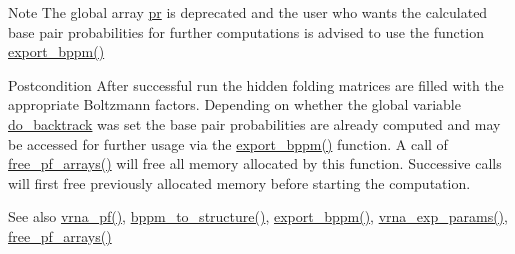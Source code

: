 \begin{DoxyNote}{Note}
The global array \mbox{\hyperlink{fold__vars_8h_ac98ec419070aee6831b44e5c700f090f}{pr}} is deprecated and the user who wants the calculated base pair probabilities for further computations is advised to use the function \mbox{\hyperlink{group__pf__fold_gac5ac7ee281aae1c5cc5898a841178073}{export\+\_\+bppm()}} 
\end{DoxyNote}
\begin{DoxyPostcond}{Postcondition}
After successful run the hidden folding matrices are filled with the appropriate Boltzmann factors. Depending on whether the global variable \mbox{\hyperlink{group__model__details_gad512b5dd4dbec60faccfe137bb474489}{do\+\_\+backtrack}} was set the base pair probabilities are already computed and may be accessed for further usage via the \mbox{\hyperlink{group__pf__fold_gac5ac7ee281aae1c5cc5898a841178073}{export\+\_\+bppm()}} function. A call of \mbox{\hyperlink{group__pf__fold_gae73db3f49a94f0f72e067ecd12681dbd}{free\+\_\+pf\+\_\+arrays()}} will free all memory allocated by this function. Successive calls will first free previously allocated memory before starting the computation. 
\end{DoxyPostcond}
\begin{DoxySeeAlso}{See also}
\mbox{\hyperlink{group__pf__fold_ga29e256d688ad221b78d37f427e0e99bc}{vrna\+\_\+pf()}}, \mbox{\hyperlink{group__struct__utils_ga129d81c4a1ead793c5b2311333e03dfa}{bppm\+\_\+to\+\_\+structure()}}, \mbox{\hyperlink{group__pf__fold_gac5ac7ee281aae1c5cc5898a841178073}{export\+\_\+bppm()}}, \mbox{\hyperlink{group__energy__parameters_gab1f3016f96aa96bff020cdd904605afa}{vrna\+\_\+exp\+\_\+params()}}, \mbox{\hyperlink{group__pf__fold_gae73db3f49a94f0f72e067ecd12681dbd}{free\+\_\+pf\+\_\+arrays()}} 
\end{DoxySeeAlso}

